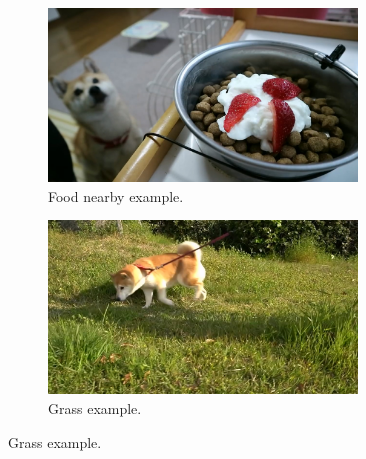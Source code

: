 \documentclass[letterpaper]{article}
\begin{document}
\begin{figure}[h]
\begin{subfigure}[]{0.4\textwidth}
	\centering
	\includegraphics[width=0.9\textwidth]{images/foodnearby.jpg}
	\caption{Food nearby example.}
\label{fig:loc5}
\end{subfigure}
\begin{subfigure}[]{0.4\textwidth}
	\centering
	\includegraphics[width=0.9\textwidth]{images/grass.jpg}
	\caption{Grass example.}
	\label{fig:loc6}
\end{subfigure}


\end{figure}
\end{document}
